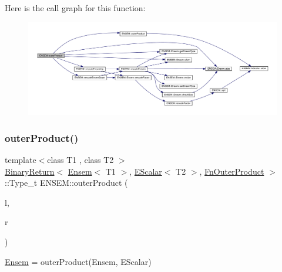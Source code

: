 Here is the call graph for this function\+:\nopagebreak
\begin{figure}[H]
\begin{center}
\leavevmode
\includegraphics[width=350pt]{d1/d9e/group__eensem_ga2e9659bc245cd1b2e76ef274c78e26a3_cgraph}
\end{center}
\end{figure}
\mbox{\label{group__eensem_ga13dd888cacbe0e5a3c85217eeb2c9002}} 
\subsubsection{\texorpdfstring{outerProduct()}{outerProduct()}\hspace{0.1cm}{\footnotesize\ttfamily [2/3]}}
{\footnotesize\ttfamily template$<$class T1 , class T2 $>$ \\
\mbox{\hyperlink{structENSEM_1_1BinaryReturn}{Binary\+Return}}$<$ \mbox{\hyperlink{classENSEM_1_1Ensem}{Ensem}}$<$ T1 $>$, \mbox{\hyperlink{classENSEM_1_1EScalar}{E\+Scalar}}$<$ T2 $>$, \mbox{\hyperlink{structENSEM_1_1FnOuterProduct}{Fn\+Outer\+Product}} $>$\+::Type\+\_\+t E\+N\+S\+E\+M\+::outer\+Product (\begin{DoxyParamCaption}\item[{const \mbox{\hyperlink{classENSEM_1_1Ensem}{Ensem}}$<$ T1 $>$ \&}]{l,  }\item[{const \mbox{\hyperlink{classENSEM_1_1EScalar}{E\+Scalar}}$<$ T2 $>$ \&}]{r }\end{DoxyParamCaption})\hspace{0.3cm}{\ttfamily [inline]}}



\mbox{\hyperlink{classENSEM_1_1Ensem}{Ensem}} = outer\+Product(\+Ensem, E\+Scalar) 

